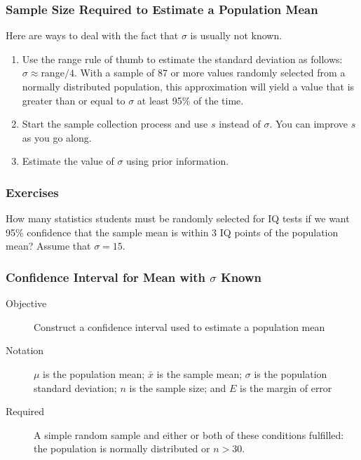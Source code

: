 \documentclass[xcolor=dvipsnames]{beamer}
\begin{document}
\begin{frame}
  \frametitle{Sample Size Required to Estimate a Population Mean}
Here are ways to deal with the fact that $\sigma$ is usually not
known.
\begin{enumerate}
\item Use the range rule of thumb to estimate the standard deviation
  as follows: $\sigma\approx$range$/4$. With a sample of 87 or more
  values randomly selected from a normally distributed population,
  this approximation will yield a value that is greater than or equal
  to $\sigma$ at least 95\% of the time.
\item Start the sample collection process and use $s$ instead of
  $\sigma$. You can improve $s$ as you go along.
\item Estimate the value of $\sigma$ using prior information. 
\end{enumerate}
\end{frame}

\begin{frame}
  \frametitle{Exercises}
  {\ubung} How many statistics students must be randomly selected for
  IQ tests if we want 95\% confidence that the sample mean is within 3
  IQ points of the population mean? Assume that $\sigma=15$.
\end{frame}

\begin{frame}
  \frametitle{Confidence Interval for Mean with $\sigma$
    Known}
  \begin{description}
  \item[Objective] Construct a confidence interval used to estimate a
    population mean
  \item[Notation] $\mu$ is the population mean; $\bar{x}$ is the
    sample mean; $\sigma$ is the population standard deviation;
    $n$ is the sample size; and $E$ is the margin of error
  \item[Required] A simple random sample and either or both of these
    conditions fulfilled: the population is normally distributed or
    $n>30$.
  \end{description}
\end{frame}

\end{document}
